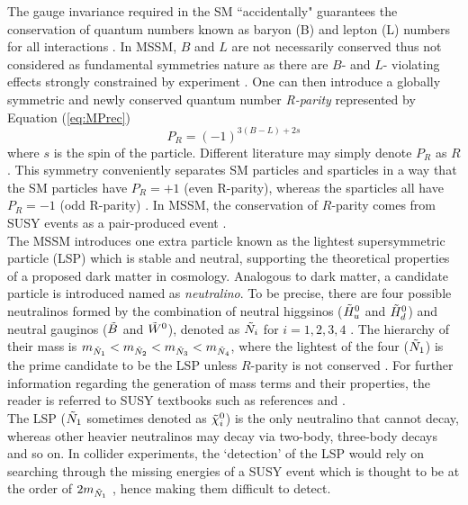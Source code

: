 The gauge invariance required in the SM ``accidentally" \cite{martin1997supersymmetry} guarantees the conservation of quantum numbers known as baryon (B) and lepton (L) numbers for all interactions \cite{baer2006weak}. In MSSM, $B$ and $L$ are not necessarily conserved thus not considered as fundamental symmetries nature as there are $B$- and $L$- violating effects strongly constrained by experiment \cite{martin1997supersymmetry}. One can then introduce a globally symmetric and newly conserved quantum number \textit{R-parity} \cite{martin1997supersymmetry, baer2006weak} represented by Equation (\ref{eq:MPrec})
\begin{equation}
    P_R=(-1)^{3(B-L)+2s}
    \label{eq:MPrec}
\end{equation}
where $s$ is the spin of the particle. Different literature may simply denote $P_R$ \cite{martin1997supersymmetry} as $R$ \cite{baer2006weak}. This symmetry conveniently separates SM particles and sparticles in a way that the SM particles have $P_R=+1$ (even R-parity), whereas the sparticles all have $P_R=-1$ (odd R-parity) \cite{martin1997supersymmetry}. In MSSM, the conservation of $R$-parity comes from SUSY events as a pair-produced event \cite{aitchison2007supersymmetry}. \\

The MSSM introduces one extra particle known as the lightest supersymmetric particle (LSP) which is stable and neutral, supporting the theoretical properties of a proposed dark matter in cosmology. Analogous to dark matter, a candidate particle is introduced named as \textit{neutralino}. To be precise, there are four possible neutralinos formed by the combination of neutral higgsinos ($\Tilde{H}_u^0$ and $ \Tilde{H}_d^0 $) and neutral gauginos ($\Tilde{B}$ and $\Tilde{W}^0$), denoted as $\Tilde{N}_i$ for $i=1,2,3,4$ \cite{martin1997supersymmetry}. The hierarchy of their mass is $ m_{\Tilde{N}_1} < m_{\Tilde{N}_2} < m_{\Tilde{N}_3} < m_{\Tilde{N}_4}$, where the lightest of the four ($\Tilde{N}_1$) is the prime candidate to be the LSP unless $R$-parity is not conserved \cite{martin1997supersymmetry}. For further information regarding the generation of mass terms and their properties, the reader is referred to SUSY textbooks such as references \cite{martin1997supersymmetry} and \cite{baer2006weak}. \\

The LSP ($\Tilde{N}_1$ sometimes denoted as $\Tilde{\chi}_i^0$) is the only neutralino that cannot decay, whereas other heavier neutralinos may decay via two-body, three-body decays and so on. In collider experiments, the `detection' of the LSP would rely on searching through the missing energies of a SUSY event which is thought to be at the order of $ 2m_{\Tilde{N}_1}$ \cite{aitchison2007supersymmetry}, hence making them difficult to detect.  \\
